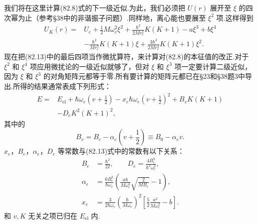 我们将在这里计算(82.8)式的下一级近似.为此，我们必须把 $U(r)$ 展开至 $\xi$ 的四次幂为止（参考§38中的非谐振子问题）.同样地，离心能也要展至 $\xi^2$ 项.这样得到
\begin{equation}
\begin{aligned}
  U_K(r)={}&U_e+\frac{1}{2}M\omega_e^2\xi^2+\frac{\hbar^2}{2Mr_e^2}K(K+1)-a\xi^3+b\xi^4\\
  &-\frac{\hbar^2}{Mr_e^3}K(K+1)\xi+\frac{3\hbar^2}{2Mr_e^4}K(K+1)\xi^2.
\end{aligned}
\end{equation}
现在把(82.13)中的最后四项当作微扰算符，来计算对(82.8)的本征值的改正.对于 $\xi^2$ 和 $\xi^4$ 项应用微扰论的一级近似就够了，但对 $\xi$ 和 $\xi^3$ 项一定要计算二级近似，因为 $\xi$ 和 $\xi^3$ 的对角矩阵元都等于零.所有要计算的矩阵元都已在§23和§38题3中导出.所得的结果通常表成下列形式：
\begin{equation}
\begin{aligned}
  E={}&E_{\mathrm{el}}+\hbar\omega_e\left(v+\frac{1}{2}\right)
  -x_e\hbar\omega_e\left(v+\frac{1}{2}\right)^2+B_vK(K+1)\\
  &-D_eK^2(K+1)^2,
\end{aligned}
\end{equation}
其中的
\begin{equation}
  B_v=B_e-\alpha_e\left(v+\frac{1}{2}\right)\equiv B_0-\alpha_ev.
\end{equation}
$x_e$，$B_e$，$\alpha_e$，$D_e$ 等常数与(82.13)式中的常数有以下关系：
\begin{equation}
\begin{aligned}
  B_e&=\frac{\hbar^2}{2I},\qquad D_e=\frac{4B_e^3}{\hbar^2\omega_e^2},\\
  \alpha_e&=\frac{6B_e^2}{\hbar\omega_e}
  \left(\frac{a\hbar}{M\omega_e^2}\sqrt{\frac{2}{MB_e}}-1\right),\\
  x_e&=\frac{3}{2\hbar\omega_e}\left(\frac{\hbar}{M\omega_e}\right)^2
  \left[\frac{5}{2}\frac{a^2}{M\omega_e^2}-b\right].
\end{aligned}
\end{equation}
和 $v,K$ 无关之项已归在 $E_{\mathrm{el}}$ 内.

